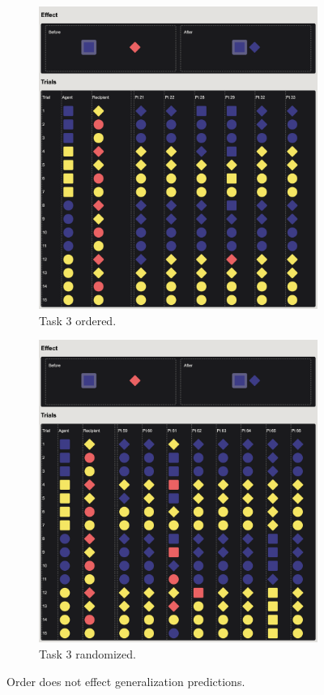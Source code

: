 \documentclass{article}
\begin{document}
\newpage
\begin{figure}
  \centering
  \begin{subfigure}[t]{0.45\textwidth}
    \centering
    \includegraphics[width=\linewidth]{raw_g3} 
    \caption{Task 3 ordered.} \label{fig:raw_g3_ordered}
  \end{subfigure}
  \hfil
  \begin{subfigure}[t]{0.45\textwidth}
    \centering
    \includegraphics[width=\linewidth]{random} 
    \caption{Task 3 randomized.} \label{fig:random}
  \end{subfigure}
  \caption{Order does not effect generalization predictions.}
\end{figure}
\end{document}
